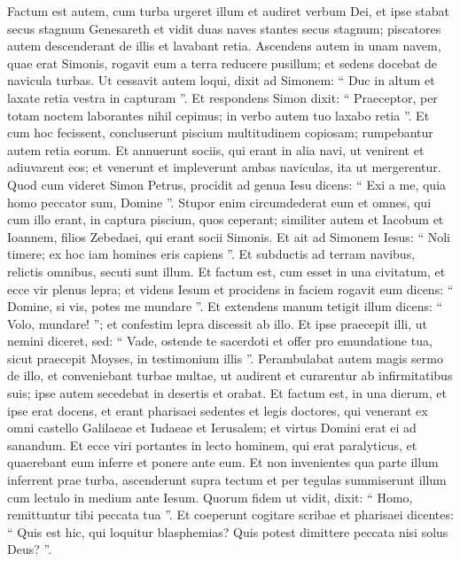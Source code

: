 \begin{biblechapter}
\begin{biblechapter}
\begin{biblechapter}
\begin{biblechapter}
\begin{biblechapter}
\verse Factum est autem, cum turba urgeret illum et audiret verbum Dei, et ipse stabat secus stagnum Genesareth 
\verse et vidit duas naves stantes secus stagnum; piscatores autem descenderant de illis et lavabant retia. 
\verse Ascendens autem in unam navem, quae erat Simonis, rogavit eum a terra reducere pusillum; et sedens docebat de navicula turbas.
 \verse Ut cessavit autem loqui, dixit ad Simonem: “ Duc in altum et laxate retia vestra in capturam ”. 
\verse Et respondens Simon dixit: “ Praeceptor, per totam noctem laborantes nihil cepimus; in verbo autem tuo laxabo retia ”. 
\verse Et cum hoc fecissent, concluserunt piscium multitudinem copiosam; rumpebantur autem retia eorum. 
\verse Et annuerunt sociis, qui erant in alia navi, ut venirent et adiuvarent eos; et venerunt et impleverunt ambas naviculas, ita ut mergerentur. 
\verse Quod cum videret Simon Petrus, procidit ad genua Iesu dicens: “ Exi a me, quia homo peccator sum, Domine ”. 
\verse Stupor enim circumdederat eum et omnes, qui cum illo erant, in captura piscium, quos ceperant; 
\verse similiter autem et Iacobum et Ioannem, filios Zebedaei, qui erant socii Simonis. Et ait ad Simonem Iesus: “ Noli timere; ex hoc iam homines eris capiens ”. 
\verse Et subductis ad terram navibus, relictis omnibus, secuti sunt illum.
 \verse Et factum est, cum esset in una civitatum, et ecce vir plenus lepra; et videns Iesum et procidens in faciem rogavit eum dicens: “ Domine, si vis, potes me mundare ”. 
\verse Et extendens manum tetigit illum dicens: “ Volo, mundare! ”; et confestim lepra discessit ab illo. 
\verse Et ipse praecepit illi, ut nemini diceret, sed: “ Vade, ostende te sacerdoti et offer pro emundatione tua, sicut praecepit Moyses, in testimonium illis ”. 
\verse Perambulabat autem magis sermo de illo, et conveniebant turbae multae, ut audirent et curarentur ab infirmitatibus suis; 
\verse ipse autem secedebat in desertis et orabat.
 \verse Et factum est, in una dierum, et ipse erat docens, et erant pharisaei sedentes et legis doctores, qui venerant ex omni castello Galilaeae et Iudaeae et Ierusalem; et virtus Domini erat ei ad sanandum. 
\verse Et ecce viri portantes in lecto hominem, qui erat paralyticus, et quaerebant eum inferre et ponere ante eum. 
\verse Et non invenientes qua parte illum inferrent prae turba, ascenderunt supra tectum et per tegulas summiserunt illum cum lectulo in medium ante Iesum. 
\verse Quorum fidem ut vidit, dixit: “ Homo, remittuntur tibi peccata tua ”. 
 \verse Et coeperunt cogitare scribae et pharisaei dicentes: “ Quis est hic, qui loquitur blasphemias? Quis potest dimittere peccata nisi solus Deus? ”. 

\end{biblechapter}
\end{biblechapter}
\end{biblechapter}
\end{biblechapter}
\end{biblechapter}
